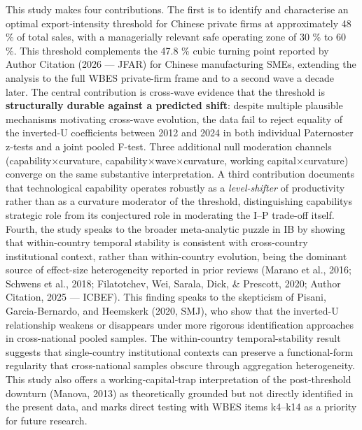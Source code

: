 \documentclass[12pt,a4paper]{article}
\begin{document}
This study makes four contributions. The first is to identify and
characterise an optimal export‑intensity threshold for Chinese private
firms at approximately 48 \% of total sales, with a managerially
relevant safe operating zone of 30 \% to 60 \%. This threshold
complements the 47.8 \% cubic turning point reported by Author Citation
(2026 --- JFAR) for Chinese manufacturing SMEs, extending the analysis
to the full WBES private-firm frame and to a second wave a decade later.
The central contribution is cross‑wave evidence that the threshold is
\textbf{structurally durable against a predicted shift}: despite
multiple plausible mechanisms motivating cross-wave evolution, the data
fail to reject equality of the inverted-U coefficients between 2012 and
2024 in both individual Paternoster z-tests and a joint pooled F-test.
Three additional null moderation channels
(capability\(\times\)curvature,
capability\(\times\)wave\(\times\)curvature, working
capital\(\times\)curvature) converge on the same substantive
interpretation. A third contribution documents that technological
capability operates robustly as a \emph{level-shifter} of productivity
rather than as a curvature moderator of the threshold, distinguishing
capability\textquotesingle s strategic role from its conjectured role in
moderating the I--P trade-off itself. Fourth, the study speaks to the
broader meta-analytic puzzle in IB by showing that within-country
temporal stability is consistent with cross-country institutional
context, rather than within-country evolution, being the dominant source
of effect-size heterogeneity reported in prior reviews (Marano et al.,
2016; Schwens et al., 2018; Filatotchev, Wei, Sarala, Dick, \& Prescott,
2020; Author Citation, 2025 --- ICBEF). This finding speaks to the
skepticism of Pisani, Garcia-Bernardo, and Heemskerk (2020, SMJ), who
show that the inverted-U relationship weakens or disappears under more
rigorous identification approaches in cross-national pooled samples. The
within-country temporal-stability result suggests that single-country
institutional contexts can preserve a functional-form regularity that
cross-national samples obscure through aggregation heterogeneity. This
study also offers a working‑capital‑trap interpretation of the
post‑threshold downturn (Manova, 2013) as theoretically grounded but not
directly identified in the present data, and marks direct testing with
WBES items k4--k14 as a priority for future research.
\end{document}
